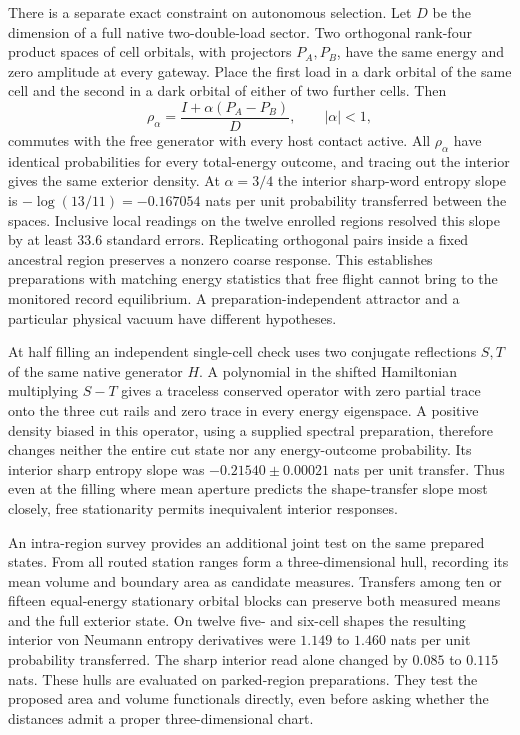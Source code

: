 \documentclass[11pt]{article}
\begin{document}
There is a separate exact constraint on autonomous selection. Let $D$
be the dimension of a full native two-double-load sector. Two orthogonal
rank-four product spaces of cell orbitals, with projectors $P_A,P_B$,
have the same energy and zero amplitude at every gateway. Place the
first load in a dark orbital of the same cell and the second in a dark
orbital of either of two further cells. Then
\[
 \rho_\alpha=\frac{I+\alpha(P_A-P_B)}{D},\qquad |\alpha|<1,
\]
commutes with the free generator with every host contact active. All
$\rho_\alpha$ have identical probabilities for every total-energy
outcome, and tracing out the interior gives the same exterior density.
At $\alpha=3/4$ the interior sharp-word entropy slope is
$-\log(13/11)=-0.167054$ nats per unit probability transferred between
the spaces. Inclusive local readings on the twelve enrolled regions
resolved this slope by at least $33.6$ standard errors. Replicating
orthogonal pairs inside a fixed ancestral region preserves a nonzero
coarse response. This establishes preparations with matching energy
statistics that free flight cannot bring to the monitored record
equilibrium. A preparation-independent attractor and a particular
physical vacuum have different hypotheses.

At half filling an independent single-cell check uses two conjugate
reflections $S,T$ of the same native generator $H$. A polynomial in
the shifted Hamiltonian multiplying $S-T$ gives a traceless conserved
operator with zero partial trace onto the three cut rails and zero
trace in every energy eigenspace. A positive density biased in this
operator, using a supplied spectral preparation, therefore changes
neither the entire cut state nor any energy-outcome probability. Its
interior sharp entropy slope was $-0.21540\pm0.00021$ nats per unit
transfer. Thus even at the filling where mean aperture predicts the
shape-transfer slope most closely, free stationarity permits inequivalent
interior responses.

An intra-region survey provides an additional joint test on the same
prepared states. From all routed station ranges form a three-dimensional
hull, recording its mean volume and boundary area as candidate measures.
Transfers among ten or fifteen equal-energy stationary orbital blocks
can preserve both measured means and the full exterior state. On twelve
five- and six-cell shapes the resulting interior von Neumann entropy
derivatives were $1.149$ to $1.460$ nats per unit probability
transferred. The sharp interior read alone changed by $0.085$ to
$0.115$ nats. These hulls are evaluated on parked-region preparations.
They test the proposed area and volume functionals directly, even
before asking whether the distances admit a proper three-dimensional
chart.
\end{document}

